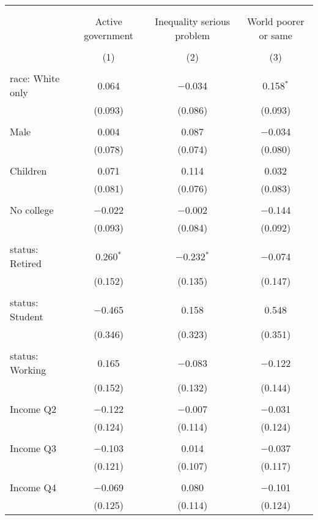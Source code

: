 
\begin{tabular}{@{\extracolsep{5pt}}lccc} 
\\[-1.8ex]\hline 
\hline \\[-1.8ex] 
\\[-1.8ex] & Active government & Inequality serious problem & World poorer or same \\ 
\\[-1.8ex] & (1) & (2) & (3)\\ 
\hline \\[-1.8ex] 
 race: White only & 0.064 & $-$0.034 & 0.158$^{*}$ \\ 
  & (0.093) & (0.086) & (0.093) \\ 
  & & & \\ 
 Male & 0.004 & 0.087 & $-$0.034 \\ 
  & (0.078) & (0.074) & (0.080) \\ 
  & & & \\ 
 Children & 0.071 & 0.114 & 0.032 \\ 
  & (0.081) & (0.076) & (0.083) \\ 
  & & & \\ 
 No college & $-$0.022 & $-$0.002 & $-$0.144 \\ 
  & (0.093) & (0.084) & (0.092) \\ 
  & & & \\ 
 status: Retired & 0.260$^{*}$ & $-$0.232$^{*}$ & $-$0.074 \\ 
  & (0.152) & (0.135) & (0.147) \\ 
  & & & \\ 
 status: Student & $-$0.465 & 0.158 & 0.548 \\ 
  & (0.346) & (0.323) & (0.351) \\ 
  & & & \\ 
 status: Working & 0.165 & $-$0.083 & $-$0.122 \\ 
  & (0.152) & (0.132) & (0.144) \\ 
  & & & \\ 
 Income Q2 & $-$0.122 & $-$0.007 & $-$0.031 \\ 
  & (0.124) & (0.114) & (0.124) \\ 
  & & & \\ 
 Income Q3 & $-$0.103 & 0.014 & $-$0.037 \\ 
  & (0.121) & (0.107) & (0.117) \\ 
  & & & \\ 
 Income Q4 & $-$0.069 & 0.080 & $-$0.101 \\ 
  & (0.125) & (0.114) & (0.124) \\ 

\end{tabular}
